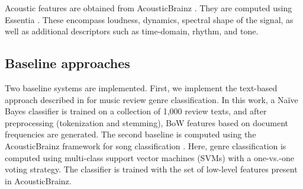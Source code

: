 Acoustic features are obtained from AcousticBrainz \citep{Porter2015}. They are computed using Essentia \citep{Bogdanov2013}. These encompass loudness, dynamics, spectral shape of the signal, as well as additional descriptors such as time-domain, rhythm, and tone.%



\subsection{Baseline approaches}
\label{sec:similarity:baselines}
Two baseline systems are implemented. First, we implement the text-based approach described in \cite{Hu2005} for music review genre classification. In this work, a Na\"{i}ve Bayes classifier is trained on a collection of 1,000 review texts, and after preprocessing (tokenization and stemming), BoW features based on document frequencies are generated.
The second baseline is computed using the AcousticBrainz framework for song classification \cite{Porter2015}. Here, genre classification is computed using  multi-class support vector machines (SVMs) with a one-vs.-one voting strategy. The classifier is trained with the set of low-level features present in AcousticBrainz. %

